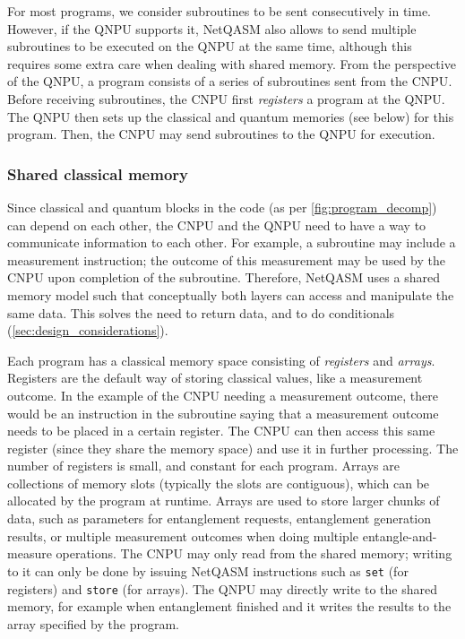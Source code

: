 For most programs, we consider subroutines to be sent consecutively in time.
However, if the \ac{QNPU} supports it, \ac{NetQASM} also allows to send multiple subroutines to be executed on the \ac{QNPU} at the same time, although this requires some extra care when dealing with shared memory.
From the perspective of the \ac{QNPU}, a program consists of a series of subroutines sent from the \ac{CNPU}.
Before receiving subroutines, the \ac{CNPU} first \textit{registers} a program at the \ac{QNPU}.
The \ac{QNPU} then sets up the classical and quantum memories (see below) for this program.
Then, the \ac{CNPU} may send subroutines to the \ac{QNPU} for execution.


\subsubsection{Shared classical memory}
Since classical and quantum blocks in the code (as per \cref{fig:program_decomp}) can depend on each other, the \ac{CNPU} and the \ac{QNPU} need to have a way to communicate information to each other.
For example, a subroutine may include a measurement instruction; the outcome of this measurement may be used by the \ac{CNPU} upon completion of the subroutine.
Therefore, \ac{NetQASM} uses a shared memory model such that conceptually both layers can access and manipulate the same data. This solves the need to return data, and to do conditionals (\cref{sec:design_considerations}).

Each program has a classical memory space consisting of \textit{registers} and \textit{arrays}.
Registers are the default way of storing classical values, like a measurement outcome.
In the example of the \ac{CNPU} needing a measurement outcome, there would be an instruction in the subroutine saying that a measurement outcome needs to be placed in a certain register.
The \ac{CNPU} can then access this same register (since they share the memory space) and use it in further processing.
The number of registers is small, and constant for each program.
Arrays are collections of memory slots (typically the slots are contiguous), which can be allocated by the program at runtime.
Arrays are used to store larger chunks of data, such as parameters for entanglement requests, entanglement generation results, or multiple measurement outcomes when doing multiple entangle-and-measure operations.
The \ac{CNPU} may only read from the shared memory; writing to it can only be done by issuing \ac{NetQASM} instructions such as \texttt{set} (for registers) and \texttt{store} (for arrays).
The \ac{QNPU} may directly write to the shared memory, for example when entanglement finished and it writes the results to the array specified by the program.


